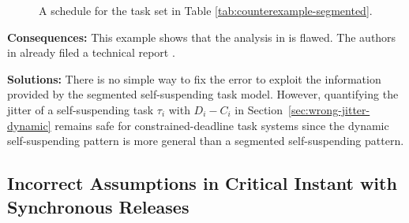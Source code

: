 \begin{figure}[t]
{}       
\caption{A schedule for the task set in Table  \ref{tab:counterexample-segmented}. }
\label{fig:counterexample-segmented}
\end{figure}


{\bf Consequences:} This example shows that the analysis in \cite{RTCSA-BletsasA05} is flawed.  The authors in \cite{RTCSA-BletsasA05}  already filed a technical report \cite{BletsasReport2015}.

{\bf Solutions:} There is no simple way to fix the error to exploit the information provided by the segmented self-suspending task model. However, quantifying the jitter of a self-suspending task $\tau_i$ with $D_i-C_i$ in Section~\ref{sec:wrong-jitter-dynamic}  remains safe for constrained-deadline task systems since the dynamic self-suspending pattern is more general than a segmented self-suspending pattern.

\subsection{Incorrect Assumptions in Critical Instant with Synchronous Releases}
\label{sec:wrong-critical}

